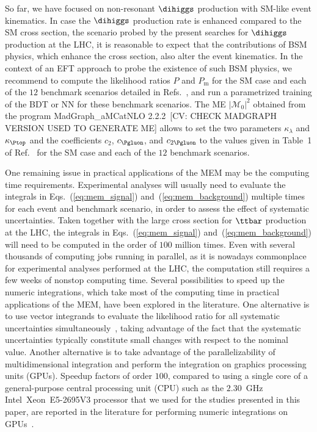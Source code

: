 So far, we have focused on non-resonant $\dihiggs$ production with SM-like event kinematics.
In case the $\dihiggs$ production rate is enhanced compared to the SM cross section, the scenario probed by the present searches for $\dihiggs$ production at the LHC,
it is reasonable to expect that the contributions of BSM physics, which enhance the cross section, also alter the event kinematics.
In the context of an EFT approach to probe the existence of such BSM physics,
we recommend to compute the likelihood ratios $P$ and $P_{\textrm{m}}$ for the SM case and each of the $12$ benchmark scenarios detailed in Refs.~\cite{Carvalho:2015ttv,Carvalho:2016rys},
and run a parametrized training of the BDT or NN for these benchmark scenarios.
The ME $\vert \mathcal{M}_{0} \vert^{2}$ obtained from the program MadGraph\_aMCatNLO 2.2.2~\cite{MadGraph_aMCatNLO}[CV: CHECK MADGRAPH VERSION USED TO GENERATE ME]
allows to set the two parameters $\kappa_{\lambda}$ and $\kappa_{\Ptop}$ and the coefficients $c_{2}$, $c_{\Pgluon}$, and $c_{2\Pgluon}$
to the values given in Table~1 of Ref.~\cite{Carvalho:2015ttv} for the SM case and each of the $12$ benchmark scenarios.

One remaining issue in practical applications of the MEM may be the computing time requirements.
Experimental analyses will usually need to evaluate the integrals in Eqs.~(\ref{eq:mem_signal}) and~(\ref{eq:mem_background})
multiple times for each event and benchmark scenario,
in order to assess the effect of systematic uncertainties.
Taken together with the large cross section for $\ttbar$ production at the LHC,
the integrals in Eqs.~(\ref{eq:mem_signal}) and~(\ref{eq:mem_background}) will need to be computed in the order of $100$ million times.
Even with several thousands of computing jobs running in parallel,
as it is nowadays commonplace for experimental analyses performed at the LHC,
the computation still requires a few weeks of nonstop computing time.
Several possibilities to speed up the numeric integrations, which take most of the computing time in practical applications of the MEM,
have been explored in the literature.
One alternative is to use vector integrands to evaluate the likelihood ratio for all systematic uncertainties simultaneously~\cite{CUBA},
taking advantage of the fact that the systematic uncertainties typically constitute small changes with respect to the nominal value.
Another alternative is to take advantage of the parallelizability of multidimensional integration and perform the integration on graphics processing units (GPUs).
Speedup factors of order $100$, compared to using a single core of a general-purpose central processing unit (CPU) 
such as the $2.30$~GHz Intel\TReg~Xeon\TReg~E5-2695V3 processor that we used for the studies presented in this paper,
are reported in the literature for performing numeric integrations on GPUs~\cite{Hagiwara:2009aq,Hagiwara:2009cy,Kanzaki:2010ym,Hagiwara:2013oka,Schouten:2014yza,Grasseau:2015vfa}.
